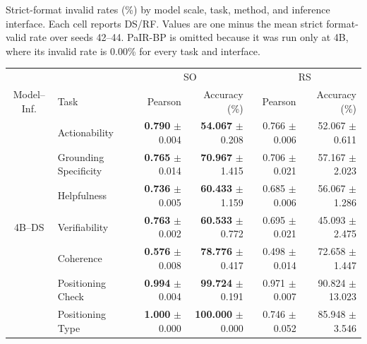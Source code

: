 \begin{table}[p]
\caption{Strict-format invalid rates (\%) by model scale, task, method,
and inference interface. Each cell reports DS/RF. Values are one minus
the mean strict format-valid rate over seeds 42--44. PaIR-BP is omitted
because it was run only at 4B, where its invalid rate is 0.00\% for every
task and interface.}
\label{tab:strict-invalid-rates-all-methods}
\end{table}

\begin{table}[!t]
\centering
\captionsetup{font=compacttable,skip=3pt}

{\fontsize{9pt}{9.8pt}\selectfont
\setlength{\tabcolsep}{2.0pt}
\renewcommand{\arraystretch}{0.85}
\begin{tabular*}{\textwidth}{@{\extracolsep{\fill}}clrrrr@{}}
\toprule
& & \multicolumn{2}{c}{SO} & \multicolumn{2}{c}{RS} \\
\cmidrule(lr){3-4} \cmidrule(lr){5-6}
Model--Inf. & Task & Pearson & Accuracy (\%) & Pearson & Accuracy (\%) \\
\midrule

\multirow{7}{*}{4B--DS}
& Actionability & \textbf{0.790} $\pm$ 0.004 & \textbf{54.067} $\pm$ 0.208 & 0.766 $\pm$ 0.006 & 52.067 $\pm$ 0.611 \\
& Grounding Specificity & \textbf{0.765} $\pm$ 0.014 & \textbf{70.967} $\pm$ 1.415 & 0.706 $\pm$ 0.021 & 57.167 $\pm$ 2.023 \\
& Helpfulness & \textbf{0.736} $\pm$ 0.005 & \textbf{60.433} $\pm$ 1.159 & 0.685 $\pm$ 0.006 & 56.067 $\pm$ 1.286 \\
& Verifiability & \textbf{0.763} $\pm$ 0.002 & \textbf{60.533} $\pm$ 0.772 & 0.695 $\pm$ 0.021 & 45.093 $\pm$ 2.475 \\
& Coherence & \textbf{0.576} $\pm$ 0.008 & \textbf{78.776} $\pm$ 0.417 & 0.498 $\pm$ 0.014 & 72.658 $\pm$ 1.447 \\
& Positioning Check & \textbf{0.994} $\pm$ 0.004 & \textbf{99.724} $\pm$ 0.191 & 0.971 $\pm$ 0.007 & 90.824 $\pm$ 13.023 \\
& Positioning Type & \textbf{1.000} $\pm$ 0.000 & \textbf{100.000} $\pm$ 0.000 & 0.746 $\pm$ 0.052 & 85.948 $\pm$ 3.546 \\
\midrule


\end{tabular*}}
\end{table}
